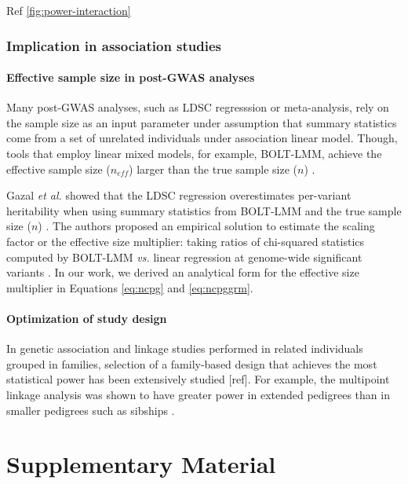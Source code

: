 \documentclass[]{book}
\begin{document}
Ref \ref{fig:power-interaction}

\subsection{Implication in association
studies}\label{implication-in-association-studies}

\subsubsection{Effective sample size in post-GWAS
analyses}\label{effective-sample-size-in-post-gwas-analyses}

Many post-GWAS analyses, such as LDSC regresssion or meta-analysis, rely
on the sample size as an input parameter under assumption that summary
statistics come from a set of unrelated individuals under association
linear model. Though, tools that employ linear mixed models, for
example, BOLT-LMM, achieve the effective sample size (\(n_{eff}\))
larger than the true sample size (\(n\)) \citep{loh2018mixed}.

Gazal \emph{et al.} showed that the LDSC regression overestimates
per-variant heritability when using summary statistics from BOLT-LMM and
the true sample size (\(n\)) \citep{Gazal2017}. The authors proposed an
empirical solution to estimate the scaling factor or the effective size
multiplier: taking ratios of chi-squared statistics computed by BOLT-LMM
\emph{vs.} linear regression at genome-wide significant variants
\citep{loh2018mixed}. In our work, we derived an analytical form for the
effective size multiplier in Equations \eqref{eq:ncpg} and
\eqref{eq:ncpggrm}.

\subsubsection{Optimization of study
design}\label{optimization-of-study-design}

In genetic association and linkage studies performed in related
individuals grouped in families, selection of a family-based design that
achieves the most statistical power has been extensively studied
{[}ref{]}. For example, the multipoint linkage analysis was shown to
have greater power in extended pedigrees than in smaller pedigrees such
as sibships \citep{Almasy1998}.

\chapter{Supplementary Material}\label{supplementary-material}
\end{document}
